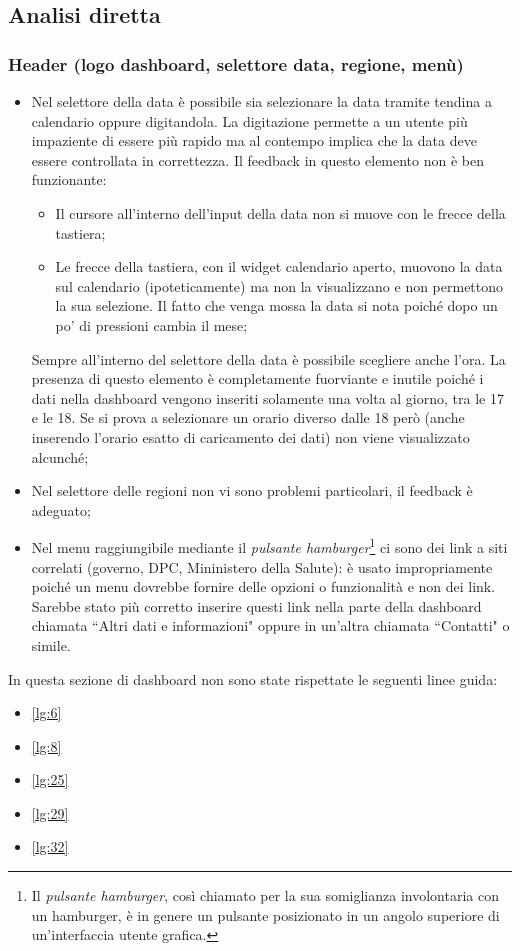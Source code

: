 \subsection{Analisi diretta}
\label{ss:analisi-diretta}

\subsubsection{Header (logo dashboard, selettore data, regione, menù)}
\label{sss:header}
\begin{itemize}
    \item Nel selettore della data è possibile sia selezionare la data tramite tendina a calendario oppure digitandola. La digitazione permette a un utente più impaziente di essere più rapido ma al contempo implica che la data deve essere controllata in correttezza. Il feedback in questo elemento non è ben funzionante:
    \begin{itemize}
        \item Il cursore all'interno dell'input della data non si muove con le frecce della tastiera;
        \item Le frecce della tastiera, con il widget calendario aperto, muovono la data sul calendario (ipoteticamente) ma non la visualizzano e non permettono la sua selezione. Il fatto che venga mossa la data si nota poiché dopo un po' di pressioni cambia il mese;
    \end{itemize}
    Sempre all'interno del selettore della data è possibile scegliere anche l'ora. La presenza di questo elemento è completamente fuorviante e inutile poiché i dati nella dashboard vengono inseriti solamente una volta al giorno, tra le 17 e le 18. Se  si prova a selezionare un orario diverso dalle 18 però (anche inserendo l'orario esatto di caricamento dei dati) non viene visualizzato alcunché;
    \item Nel selettore delle regioni non vi sono problemi particolari, il feedback è adeguato;
    \item Nel menu raggiungibile mediante il \textit{pulsante hamburger}\footnote{Il \textit{pulsante hamburger}, così chiamato per la sua somiglianza involontaria con un hamburger, è in genere un pulsante posizionato in un angolo superiore di un'interfaccia utente grafica. } ci sono dei link a siti correlati (governo, DPC, Mininistero della Salute): è usato impropriamente poiché un menu dovrebbe fornire delle opzioni o funzionalità e non dei link. Sarebbe stato più corretto inserire questi link nella parte della dashboard chiamata ``Altri dati e informazioni" oppure in un'altra chiamata ``Contatti" o simile.
\end{itemize}
In questa sezione di dashboard non sono state rispettate le seguenti linee guida:
\begin{itemize}
    \item \ref{lg:6}
    \item \ref{lg:8}
    \item \ref{lg:25}
    \item \ref{lg:29}
    \item \ref{lg:32}
\end{itemize}

